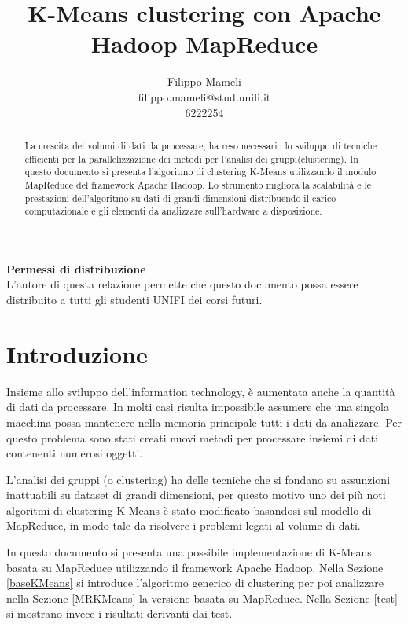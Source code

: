 \documentclass[10pt,twocolumn,letterpaper]{article}
\begin{document}
\title{K-Means clustering con Apache Hadoop MapReduce}

\author{Filippo Mameli\\
filippo.mameli@stud.unifi.it\\
6222254
}

\maketitle

\begin{abstract}
    La crescita dei volumi di dati da processare, ha reso necessario lo sviluppo
    di tecniche efficienti per la parallelizzazione dei metodi per
    l'analisi dei gruppi(clustering).
    In questo documento si presenta l'algoritmo di clustering K-Means utilizzando il
    modulo MapReduce del framework Apache Hadoop.
    Lo strumento migliora la scalabilità e le prestazioni dell'algoritmo su dati
    di grandi dimensioni distribuendo il carico computazionale e gli elementi da
    analizzare sull'hardware a disposizione.
\end{abstract}

\noindent\large\textbf{Permessi di distribuzione}\\
\indent L'autore di questa relazione permette che questo documento possa essere distribuito a tutti gli studenti UNIFI dei corsi futuri.
\section{Introduzione}
    Insieme allo sviluppo dell'information technology, è aumentata anche la
    quantità di dati da processare. In molti casi risulta impossibile assumere
    che una singola macchina possa mantenere nella memoria principale tutti
    i dati da analizzare. Per questo problema sono stati creati nuovi metodi
    per processare insiemi di dati contenenti numerosi oggetti.

    L'analisi dei gruppi (o clustering) ha delle tecniche che si fondano su
    assunzioni inattuabili su dataset di grandi dimensioni, per questo motivo
    uno dei più noti algoritmi di clustering K-Means è stato modificato basandosi
    sul modello di MapReduce, in modo tale da risolvere i problemi legati
    al volume di dati.

    In questo documento si presenta una possibile implementazione di K-Means
    basata su MapReduce utilizzando il framework Apache Hadoop. Nella Sezione
    \ref{baseKMeans} si introduce l'algoritmo generico di clustering per poi
    analizzare nella Sezione \ref{MRKMeans} la versione basata su MapReduce.
    Nella Sezione \ref{test} si mostrano invece i risultati derivanti dai
    test.
\end{document}
